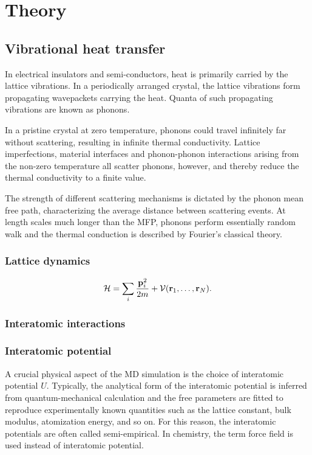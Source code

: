 \chapter{Theory}

\section{Vibrational heat transfer}

In electrical insulators and semi-conductors, heat is primarily carried by the lattice vibrations. In a periodically arranged crystal, the lattice vibrations form propagating wavepackets carrying the heat. Quanta of such propagating vibrations are known as phonons. 

In a pristine crystal at zero temperature, phonons could travel infinitely far without scattering, resulting in infinite thermal conductivity. Lattice imperfections, material interfaces and phonon-phonon interactions arising from the non-zero temperature all scatter phonons, however, and thereby reduce the thermal conductivity to a finite value. 

The strength of different scattering mechanisms is dictated by the phonon mean free path, characterizing the average distance between scattering events. At length scales much longer than the MFP, phonons perform essentially random walk and the thermal conduction is described by Fourier's classical theory. 

\subsection{Lattice dynamics}

\begin{equation}
 \mathcal{H} = \sum_{i} \frac{\mathbf{p}_i^2}{2m} + \mathcal{V}(\mathbf{r}_1,\dots,\mathbf{r}_N).
\end{equation}

\subsection{Interatomic interactions}

\subsection{Interatomic potential}

A crucial physical aspect of the MD simulation is the choice of interatomic potential $U$. Typically, the analytical form of the interatomic potential is inferred from quantum-mechanical calculation and the free parameters are fitted to reproduce experimentally known quantities such as the lattice constant, bulk modulus, atomization energy, and so on. For this reason, the interatomic potentials are often called semi-empirical. In chemistry, the term force field is used instead of interatomic potential.


